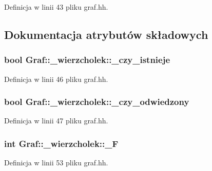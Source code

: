 \-Definicja w linii 43 pliku graf.\-hh.



\subsection{\-Dokumentacja atrybutów składowych}
\hypertarget{struct_graf_1_1__wierzcholek_a157d209583d1813f1a609cfb08682ffe}{
\subsubsection[{\-\_\-czy\-\_\-istnieje}]{\setlength{\rightskip}{0pt plus 5cm}bool {\bf \-Graf\-::\-\_\-wierzcholek\-::\-\_\-czy\-\_\-istnieje}}}\label{struct_graf_1_1__wierzcholek_a157d209583d1813f1a609cfb08682ffe}


\-Definicja w linii 46 pliku graf.\-hh.

\hypertarget{struct_graf_1_1__wierzcholek_a818c370b6e8a476f6fb9f89ccac01e2f}{
\subsubsection[{\-\_\-czy\-\_\-odwiedzony}]{\setlength{\rightskip}{0pt plus 5cm}bool {\bf \-Graf\-::\-\_\-wierzcholek\-::\-\_\-czy\-\_\-odwiedzony}}}\label{struct_graf_1_1__wierzcholek_a818c370b6e8a476f6fb9f89ccac01e2f}


\-Definicja w linii 47 pliku graf.\-hh.

\hypertarget{struct_graf_1_1__wierzcholek_a2b1a8e8fbeb43a968c2dcfed212a4318}{
\subsubsection[{\-\_\-\-F}]{\setlength{\rightskip}{0pt plus 5cm}int {\bf \-Graf\-::\-\_\-wierzcholek\-::\-\_\-\-F}}}\label{struct_graf_1_1__wierzcholek_a2b1a8e8fbeb43a968c2dcfed212a4318}


\-Definicja w linii 53 pliku graf.\-hh.

